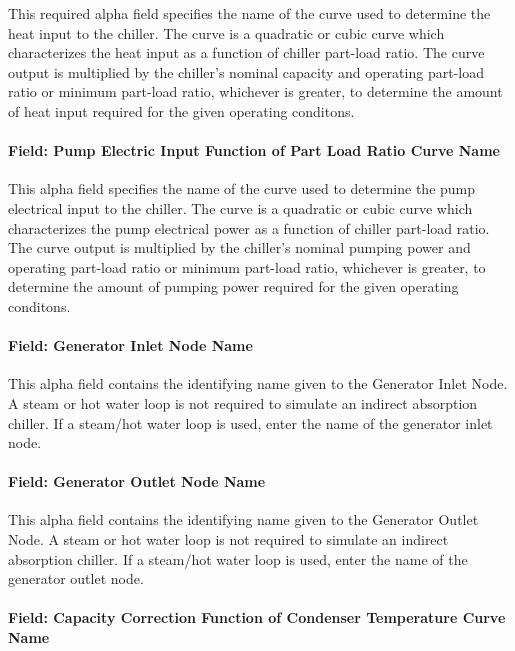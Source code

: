 This required alpha field specifies the name of the curve used to determine the heat input to the chiller. The curve is a quadratic or cubic curve which characterizes the heat input as a function of chiller part-load ratio. The curve output is multiplied by the chiller's nominal capacity and operating part-load ratio or minimum part-load ratio, whichever is greater, to determine the amount of heat input required for the given operating conditons.

\paragraph{Field: Pump Electric Input Function of Part Load Ratio Curve Name}\label{field-pump-electric-input-function-of-part-load-ratio-curve-name}

This alpha field specifies the name of the curve used to determine the pump electrical input to the chiller. The curve is a quadratic or cubic curve which characterizes the pump electrical power as a function of chiller part-load ratio. The curve output is multiplied by the chiller's nominal pumping power and operating part-load ratio or minimum part-load ratio, whichever is greater, to determine the amount of pumping power required for the given operating conditons.

\paragraph{Field: Generator Inlet Node Name}\label{field-generator-inlet-node-name-1}

This alpha field contains the identifying name given to the Generator Inlet Node. A steam or hot water loop is not required to simulate an indirect absorption chiller. If a steam/hot water loop is used, enter the name of the generator inlet node.

\paragraph{Field: Generator Outlet Node Name}\label{field-generator-outlet-node-name-1}

This alpha field contains the identifying name given to the Generator Outlet Node. A steam or hot water loop is not required to simulate an indirect absorption chiller. If a steam/hot water loop is used, enter the name of the generator outlet node.

\paragraph{Field: Capacity Correction Function of Condenser Temperature Curve Name}\label{field-capacity-correction-function-of-condenser-temperature-curve-name}

